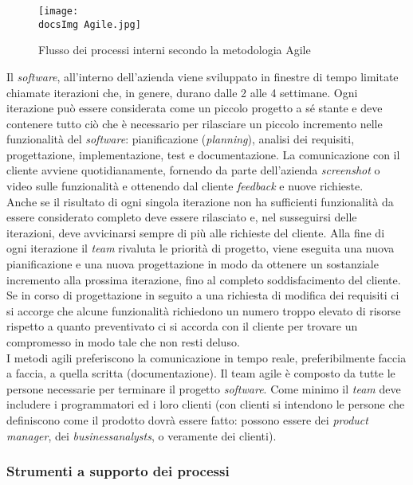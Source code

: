 \begin{figure}[H]
	\centering
	\texttt{[image: \\docsImg Agile.jpg]}
	\caption{Flusso dei processi interni secondo la metodologia Agile}
	\label{fig:Flusso dei processi interni}
\end{figure}
\noindent
Il \textit{software\gloss}, all'interno dell'azienda viene sviluppato in finestre di tempo limitate chiamate iterazioni che, in genere, durano dalle 2 alle 4 settimane. Ogni iterazione pu\`o essere considerata come un piccolo progetto a sé stante e deve contenere tutto ciò che è necessario per rilasciare un piccolo incremento nelle funzionalità del \textit{software\gloss}: pianificazione (\textit{planning}), analisi dei requisiti, progettazione, implementazione, test e documentazione. La comunicazione con il cliente avviene quotidianamente, fornendo da parte dell'azienda \textit{screenshot} o video sulle funzionalit\`a e ottenendo dal cliente \textit{feedback} e nuove richieste.
\\
Anche se il risultato di ogni singola iterazione non ha sufficienti funzionalità da essere considerato completo deve essere rilasciato e, nel susseguirsi delle iterazioni, deve avvicinarsi sempre di più alle richieste del cliente. Alla fine di ogni iterazione il \textit{team} rivaluta le priorit\`a di progetto, viene eseguita una nuova pianificazione e una nuova progettazione in modo da ottenere un sostanziale incremento alla prossima iterazione, fino al completo soddisfacimento del cliente. Se in corso di progettazione in seguito a una richiesta di modifica dei requisiti ci si accorge che alcune funzionalit\`a richiedono un numero troppo elevato di risorse rispetto a quanto preventivato ci si accorda con il cliente per trovare un compromesso in modo tale che non resti deluso.
\\
I metodi agili preferiscono la comunicazione in tempo reale, preferibilmente faccia a faccia, a quella scritta (documentazione). Il team agile è composto da tutte le persone necessarie per terminare il progetto \textit{software\gloss}. Come minimo il \textit{team} deve includere i programmatori ed i loro clienti (con clienti si intendono le persone che definiscono come il prodotto dovrà essere fatto: possono essere dei \textit{product manager}, dei \textit{business\gloss analysts}, o veramente dei clienti).

\subsubsection{Strumenti a supporto dei processi}
